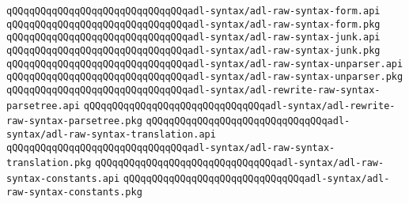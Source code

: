 \newline
\verb|qQQqqQQqqQQqqQQqqQQqqQQqqQQqqQQqadl-syntax/adl-raw-syntax-form.api|\newline
\verb|qQQqqQQqqQQqqQQqqQQqqQQqqQQqqQQqadl-syntax/adl-raw-syntax-form.pkg|\newline
\verb|qQQqqQQqqQQqqQQqqQQqqQQqqQQqqQQqadl-syntax/adl-raw-syntax-junk.api|\newline
\verb|qQQqqQQqqQQqqQQqqQQqqQQqqQQqqQQqadl-syntax/adl-raw-syntax-junk.pkg|\newline
\verb|qQQqqQQqqQQqqQQqqQQqqQQqqQQqqQQqadl-syntax/adl-raw-syntax-unparser.api|\newline
\verb|qQQqqQQqqQQqqQQqqQQqqQQqqQQqqQQqadl-syntax/adl-raw-syntax-unparser.pkg|\newline
\verb|qQQqqQQqqQQqqQQqqQQqqQQqqQQqqQQqadl-syntax/adl-rewrite-raw-syntax-parsetree.api|\newline
\verb|qQQqqQQqqQQqqQQqqQQqqQQqqQQqqQQqadl-syntax/adl-rewrite-raw-syntax-parsetree.pkg|\newline
\verb|qQQqqQQqqQQqqQQqqQQqqQQqqQQqqQQqadl-syntax/adl-raw-syntax-translation.api|\newline
\verb|qQQqqQQqqQQqqQQqqQQqqQQqqQQqqQQqadl-syntax/adl-raw-syntax-translation.pkg|\newline
\verb|qQQqqQQqqQQqqQQqqQQqqQQqqQQqqQQqadl-syntax/adl-raw-syntax-constants.api|\newline
\verb|qQQqqQQqqQQqqQQqqQQqqQQqqQQqqQQqadl-syntax/adl-raw-syntax-constants.pkg|\newline

